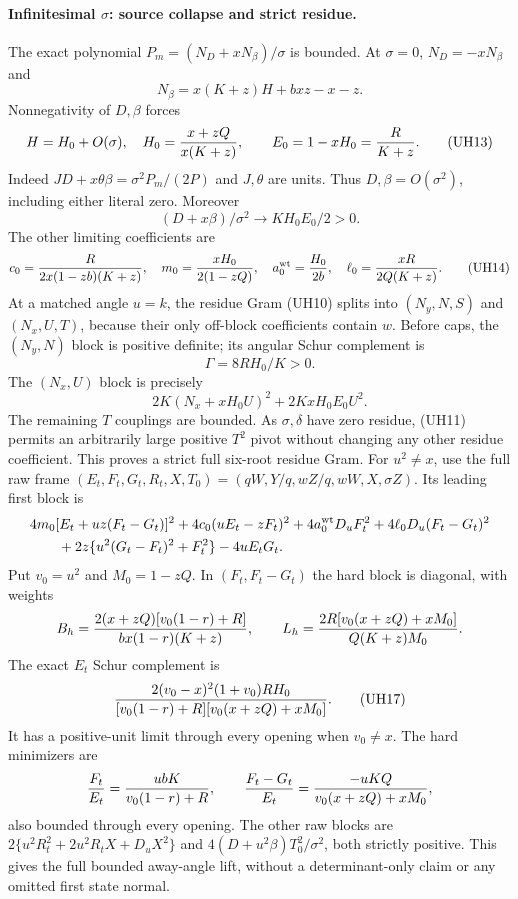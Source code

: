 \paragraph{Infinitesimal $\sigma$: source collapse and strict residue.}
The exact polynomial $P_m=(N_D+xN_\beta)/\sigma$ is bounded.
At $\sigma=0$, $N_D=-xN_\beta$ and
\[
 N_\beta=x(K+z)H+bxz-x-z.
\]
Nonnegativity of $D,\beta$ forces
\[
 H=H_0+O(\sigma),\quad
 H_0={x+zQ\over x(K+z)},\qquad E_0=1-xH_0={R\over K+z}.
                                                               \tag{UH13}
\]
Indeed $JD+x\theta\beta=\sigma^2P_m/(2P)$ and $J,\theta$
are units. Thus $D,\beta=O(\sigma^2)$, including either literal zero.
Moreover
\[
 (D+x\beta)/\sigma^2\longrightarrow KH_0E_0/2>0.
\]
The other limiting coefficients are
\[
 c_0={R\over2x(1-zb)(K+z)},\quad m_0={xH_0\over2(1-zQ)},
 \quad a_0^{\rm wt}={H_0\over2b},\quad
 \ell_0={xR\over2Q(K+z)}.                           \tag{UH14}
\]
At a matched angle $u=k$, the residue Gram (UH10) splits into
$(N_y,N,S)$ and $(N_x,U,T)$, because their only off-block coefficients
contain $w$. Before caps, the $(N_y,N)$ block is positive definite;
its angular Schur complement is
\[
 \Gamma=8RH_0/K>0.                                \tag{UH15}
\]
The $(N_x,U)$ block is precisely
\[
 2K(N_x+xH_0U)^2+2KxH_0E_0U^2.                   \tag{UH16}
\]
The remaining $T$ couplings are bounded. As $\sigma,\delta$ have
zero residue, (UH11) permits an arbitrarily large positive $T^2$
pivot without changing any other residue coefficient. This proves a
strict full six-root residue Gram. For $u^2\ne x$, use the full raw
frame $(E_t,F_t,G_t,R_t,X,T_0)=(qW,Y/q,wZ/q,wW,X,\sigma Z)$.
Its leading first block is
\begin{align*}
 &4m_0[E_t+uz(F_t-G_t)]^2+4c_0(uE_t-zF_t)^2
       +4a_0^{\rm wt}D_uF_t^2+4\ell_0D_u(F_t-G_t)^2\\
 &\qquad+2z\{u^2(G_t-F_t)^2+F_t^2\}-4uE_tG_t.
\end{align*}
Put $v_0=u^2$ and $M_0=1-zQ$. In $(F_t,F_t-G_t)$ the hard block
is diagonal, with weights
\[
 B_h={2(x+zQ)[v_0(1-r)+R]\over bx(1-r)(K+z)},\qquad
 L_h={2R[v_0(x+zQ)+xM_0]\over Q(K+z)M_0}.
\]
The exact $E_t$ Schur complement is
\[
 {2(v_0-x)^2(1+v_0)RH_0\over
 [v_0(1-r)+R][v_0(x+zQ)+xM_0]}.                  \tag{UH17}
\]
It has a positive-unit limit through every opening when $v_0\ne x$.
The hard minimizers are
\[
 {F_t\over E_t}={ubK\over v_0(1-r)+R},\qquad
 {F_t-G_t\over E_t}={-uKQ\over v_0(x+zQ)+xM_0},
\]
also bounded through every opening. The other raw blocks are
$2\{u^2R_t^2+2u^2R_tX+D_uX^2\}$ and
$4(D+u^2\beta)T_0^2/\sigma^2$, both strictly positive.
This gives the full bounded away-angle lift, without a determinant-only
claim or any omitted first state normal.

